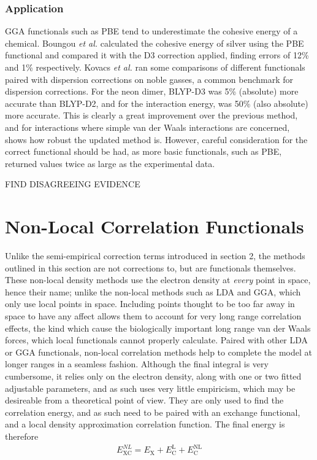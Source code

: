 \documentclass[10pt,a4paper,twocolumn,twoside]{extarticle}
\newcommand{\al}{\emph{et al. }}
\begin{document}
	\subsubsection{Application}
	 GGA functionals such as PBE tend to underestimate the cohesive energy of a chemical. Boungou \al calculated the cohesive energy of silver using the PBE functional and compared it with the D3 correction applied, finding errors of 12\% and 1\% respectively.\cite{Boungou2021} 
	 Kovacs \al ran some comparisons of different functionals paired with dispersion corrections on noble gasses, a common benchmark for dispersion corrections. For the neon dimer, BLYP-D3 was 5\% (absolute) more accurate than BLYP-D2, and for the interaction energy, was 50\% (also absolute) more accurate.\cite{Kovacs2017} 
	 This is clearly a great improvement over the previous method, and for interactions where simple van der Waals interactions are concerned, shows how robust the updated method is. However, careful consideration for the correct functional should be had, as more basic functionals, such as PBE, returned values twice as large as the experimental data.\cite{Kovacs2017}

	 FIND DISAGREEING EVIDENCE 



	\section{Non-Local Correlation Functionals}
	Unlike the semi-empirical correction terms introduced in section 2, the methods outlined in this section are not corrections to, but are functionals themselves. These non-local density methods use the electron density at \emph{every} point in space, hence their name; unlike the non-local methods such as LDA and GGA, which only use local points in space. Including points thought to be too far away in space to have any affect allows them to account for very long range correlation effects, the kind which cause the biologically important long range van der Waals forces, which local functionals cannot properly calculate. Paired with other LDA or GGA functionals, non-local correlation methods help to complete the model at longer ranges in a seamless fashion. Although the final integral is very cumbersome, it relies only on the electron density, along with one or two fitted adjustable parameters, and as such uses very little empiricism, which may be desireable from a theoretical point of view. They are only used to find the correlation energy, and as such need to be paired with an exchange functional, and a local density approximation correlation function. The final energy is therefore
	\begin{align}
		E_\text{XC}^{NL} = E_\text{X} + E_\text{C}^\text{L} + E_\text{C}^\text{NL}
	\end{align} 
\end{document}
